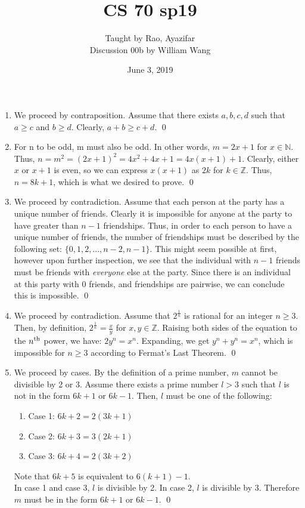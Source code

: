 \documentclass[a4paper]{article}
\title{\textbf{CS 70 sp19}}
\author{\large Taught by Rao, Ayazifar\\
Discussion 00b by William Wang}
\date{June 3, 2019}
\newcommand{\Z}{\mathbb{Z}}
\newcommand{\N}{\mathbb{N}}
\newcommand{\<}{\langle}
\renewcommand{\>}{\rangle}
\renewcommand{\^}{\wedge}
\begin{document}
\maketitle
\begin{enumerate}
    \item We proceed by contraposition. Assume that there exists $a, b, c, d$ such that $a \geq c$ and $b \geq d$. Clearly, $a + b \geq c + d$. \qed
    \item For n to be odd, m must also be odd. In other words, $m = 2x + 1$ for $x \in \N$. Thus, $n = m^2 = (2x + 1)^2 = 4x^2 + 4x + 1 = 4x(x + 1) + 1$. Clearly, either $x$ or $x + 1$ is even, so we can express $x(x + 1)$ as $2k$ for $k \in \Z$. Thus, $n = 8k + 1$, which is what we desired to prove. \qed
    \item We proceed by contradiction. Assume that each person at the party has a unique number of friends. Clearly it is impossible for anyone at the party to have greater than $n-1$ friendships. Thus, in order to each person to have a unique number of friends, the number of friendships must be described by the following set: $\{0, 1, 2, ..., n-2, n-1\}$. This might seem possible at first, however upon further inspection, we see that the individual with $n-1$ friends must be friends with \textit{everyone} else at the party. Since there is an individual at this party with 0 friends, and friendships are pairwise, we can conclude this is impossible. \qed
    \item We proceed by contradiction. Assume that $2^\frac{1}{n}$ is rational for an integer $n \geq 3$. Then, by definition, $2^\frac{1}{n} = \frac{x}{y}$ for $x, y \in \Z$. Raising both sides of the equation to the $n\textsuperscript{th}$ power, we have: $2y^n = x^n$. Expanding, we get $y^n + y^n = x^n$, which is impossible for $n \geq 3$ according to Fermat's Last Theorem. \qed
    \item We proceed by cases. By the definition of a prime number, $m$ cannot be divisible by 2 or 3. Assume there exists a prime number $l > 3$ such that $l$ is not in the form $6k + 1$ or $6k - 1$. Then, $l$ must be one of the following:
    \begin{enumerate}
        \item Case 1: $6k + 2 = 2(3k + 1)$
        \item Case 2: $6k + 3 = 3(2k + 1)$
        \item Case 3: $6k + 4 = 2(3k + 2)$
    \end{enumerate}
    Note that $6k + 5$ is equivalent to $6(k + 1) - 1$.\\
    In case 1 and case 3, $l$ is divisible by 2. In case 2, $l$ is divisible by 3. Therefore $m$ must be in the form $6k + 1$ or $6k - 1$. \qed
\end{enumerate}
\newpage
\end{document}
